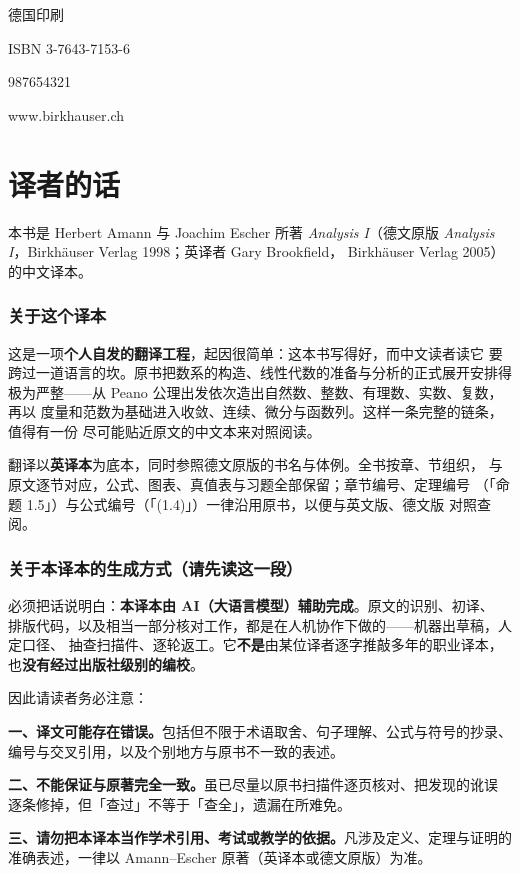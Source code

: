德国印刷

ISBN 3-7643-7153-6

987654321

www.birkhauser.ch

\chapter*{译者的话}

本书是 Herbert Amann 与 Joachim Escher 所著 \textit{Analysis I}（德文原版
\textit{Analysis I}，Birkhäuser Verlag 1998；英译者 Gary Brookfield，
Birkhäuser Verlag 2005）的中文译本。

\subsection*{关于这个译本}

这是一项\textbf{个人自发的翻译工程}，起因很简单：这本书写得好，而中文读者读它
要跨过一道语言的坎。原书把数系的构造、线性代数的准备与分析的正式展开安排得
极为严整——从 Peano 公理出发依次造出自然数、整数、有理数、实数、复数，再以
度量和范数为基础进入收敛、连续、微分与函数列。这样一条完整的链条，值得有一份
尽可能贴近原文的中文本来对照阅读。

翻译以\textbf{英译本}为底本，同时参照德文原版的书名与体例。全书按章、节组织，
与原文逐节对应，公式、图表、真值表与习题全部保留；章节编号、定理编号
（「命题 1.5」）与公式编号（「(1.4)」）一律沿用原书，以便与英文版、德文版
对照查阅。

\subsection*{关于本译本的生成方式（请先读这一段）}

必须把话说明白：\textbf{本译本由 AI（大语言模型）辅助完成}。原文的识别、初译、
排版代码，以及相当一部分核对工作，都是在人机协作下做的——机器出草稿，人定口径、
抽查扫描件、逐轮返工。它\textbf{不是}由某位译者逐字推敲多年的职业译本，也\textbf{没有经过出版社级别的编校}。

因此请读者务必注意：

\textbf{一、译文可能存在错误。}包括但不限于术语取舍、句子理解、公式与符号的抄录、
编号与交叉引用，以及个别地方与原书不一致的表述。

\textbf{二、不能保证与原著完全一致。}虽已尽量以原书扫描件逐页核对、把发现的讹误
逐条修掉，但「查过」不等于「查全」，遗漏在所难免。

\textbf{三、请勿把本译本当作学术引用、考试或教学的依据。}凡涉及定义、定理与证明的
准确表述，一律以 Amann--Escher 原著（英译本或德文原版）为准。


